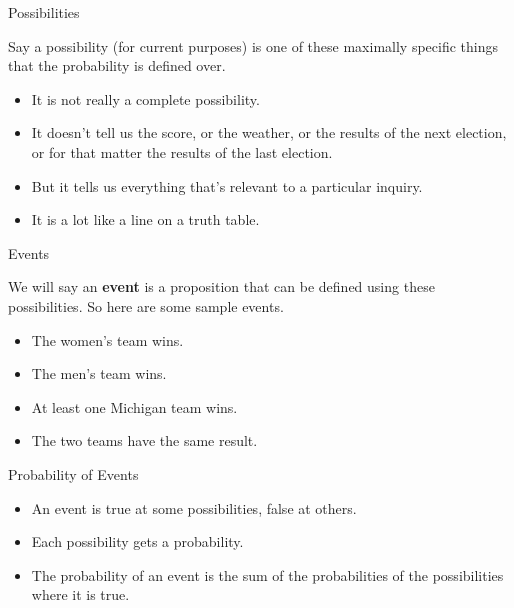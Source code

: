 \documentclass[
  ignorenonframetext,
]{beamer}
\providecommand{\tightlist}{%
  \setlength{\itemsep}{0pt}\setlength{\parskip}{0pt}}
\renewcommand{\,}{\text{, }}
\begin{document}
\begin{frame}{Possibilities}
\protect\hypertarget{possibilities}{}

Say a possibility (for current purposes) is one of these maximally
specific things that the probability is defined over.

\begin{itemize}
\tightlist
\item
  It is not really a complete possibility.
\item
  It doesn't tell us the score, or the weather, or the results of the
  next election, or for that matter the results of the last election.
\item
  But it tells us everything that's relevant to a particular inquiry.
\item
  It is a lot like a line on a truth table.
\end{itemize}

\end{frame}

\begin{frame}{Events}
\protect\hypertarget{events}{}

We will say an \textbf{event} is a proposition that can be defined using
these possibilities. So here are some sample events.

\begin{itemize}
\tightlist
\item
  The women's team wins.
\item
  The men's team wins.
\item
  At least one Michigan team wins.
\item
  The two teams have the same result.
\end{itemize}

\end{frame}

\begin{frame}{Probability of Events}
\protect\hypertarget{probability-of-events}{}

\begin{itemize}
\tightlist
\item
  An event is true at some possibilities, false at others.
\item
  Each possibility gets a probability.
\item
  The probability of an event is the sum of the probabilities of the
  possibilities where it is true.
\end{itemize}

\end{frame}
\end{document}
